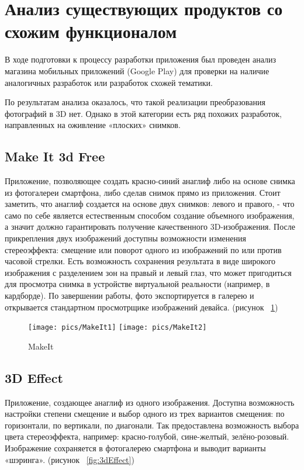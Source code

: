 
\section{Анализ существующих продуктов со схожим функционалом}
В ходе подготовки к процессу разработки приложения был проведен анализ магазина мобильных приложений (Google Play) для проверки на наличие аналогичных разработок или разработок схожей тематики.

По результатам анализа оказалось, что такой реализации преобразования фотографий в 3D нет. Однако в этой категории есть ряд похожих разработок, направленных на оживление «плоских» снимков. 

\subsection{Make It 3d Free}

Приложение, позволяющее создать красно-синий анаглиф либо на основе снимка из фотогалереи смартфона, либо сделав снимок прямо из приложения. Стоит заметить, что анаглиф создается на основе двух снимков:  левого и правого, - что само по себе является естественным способом создание объемного изображения, а значит должно гарантировать получение качественного 3D-изображения. После прикрепления двух изображений доступны возможности изменения стереоэффекта: смещение или поворот одного из изображений по или против часовой стрелки. Есть возможность сохранения результата в виде широкого изображения с разделением зон на правый и левый глаз, что может пригодиться для просмотра снимка в устройстве виртуальной реальности (например, в кардборде). По завершении работы, фото экспортируется в галерею и открывается стандартном просмотрщике изображений девайса. (рисунок ~\ref{fig:MakeIt})

\begin{figure}[H]
	\centering
	\texttt{[image: pics/MakeIt1]}
	\texttt{[image: pics/MakeIt2]}
	\caption{MakeIt}
	\label{fig:MakeIt}
\end{figure}

\subsection{3D Effect}

Приложение, создающее анаглиф из одного изображения. Доступна возможность настройки степени смещение и выбор одного из трех вариантов смещения:  по горизонтали, по вертикали, по диагонали. Так предоставлена возможность выбора цвета стереоэффекта, например: красно-голубой, сине-желтый, зелёно-розовый. Изображение сохраняется в фотогалерею смартфона и выводит варианты «шэринга». (рисунок ~\ref{fig:3dEffect})

